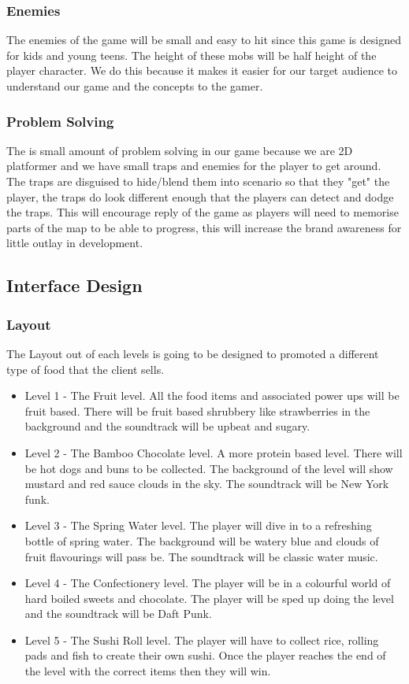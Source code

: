 \documentclass{article}
\begin{document}
\subsubsection{Enemies}
The enemies of the game will be small and easy to hit since this game is designed for kids and young teens. The height of these mobs will be half height of the player character. We do this because it makes it easier for our target audience to understand our game and the concepts to the gamer. 


\subsubsection{Problem Solving}
The is small amount of problem solving in our game because we are 2D platformer and we have small traps and enemies for the player to get around. The traps are disguised to hide/blend them into scenario so that they "get" the player, the traps do look different enough that the players can detect and dodge the traps. This will encourage reply of the game as players will need to memorise parts of the map to be able to progress, this will increase the brand awareness for little outlay in development.

\subsection{Interface Design}
\subsubsection{Layout}
The Layout out of each levels is going to be designed to promoted a different type of food that the client sells. 
\begin{itemize}
	\item Level 1 - The Fruit level. All the food items and associated power ups will be fruit based. There will be fruit based shrubbery like strawberries in the background and the soundtrack will be upbeat and sugary.
	\item Level 2 - The Bamboo Chocolate level. A more protein based level. There will be hot dogs and buns to be collected. The background of the level will show mustard and red sauce clouds in the sky. The soundtrack will be New York funk.
	\item Level 3 - The Spring Water level. The player will dive in to a refreshing bottle of spring water. The background will be watery blue and clouds of fruit flavourings will pass be. The soundtrack will be classic water music.
	\item Level 4 - The Confectionery level. The player will be in a colourful world of hard boiled sweets and chocolate. The player will be sped up doing the level and the soundtrack will be Daft Punk.
	\item Level 5 - The Sushi Roll level. The player will have to collect rice, rolling pads and fish to create their own sushi. Once the player reaches the end of the level with the correct items then they will win.
\end{itemize}
\end{document}
